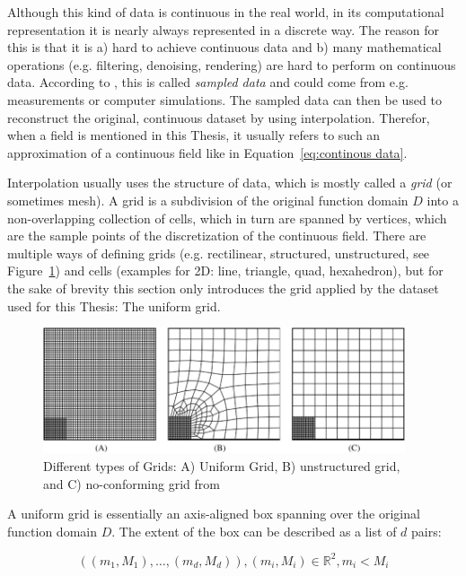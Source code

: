 Although this kind of data is continuous in the real world, in its computational representation it is nearly always represented in a discrete way. 
The reason for this is that it is a) hard to achieve continuous data and b) many mathematical operations (e.g. filtering, denoising, rendering) are hard to perform on continuous data. 
According to , this is called \textit{sampled data} and could come from e.g. measurements or computer simulations. 
The sampled data can then be used to reconstruct the original, continuous dataset by using interpolation. 
Therefor, when a field is mentioned in this Thesis, it usually refers to such an approximation of a continuous field like in Equation~\ref{eq:continous data}. 


Interpolation usually uses the structure of data, which is mostly called a \textit{grid} (or sometimes mesh). 
A grid is a subdivision of the original function domain $D$ into a non\--overlapping collection of cells, which in turn are spanned by vertices, which are the sample points of the discretization of the continuous field.  
There are multiple ways of defining grids (e.g. rectilinear, structured, unstructured, see Figure~\ref{fig:grid types}) and cells (examples for 2D: line, triangle, quad, hexahedron), but for the sake of brevity this section only introduces the grid applied by the dataset used for this Thesis: The uniform grid. 

\begin{figure}
  \includegraphics[width=0.95\textwidth]{figures/grid-types.png}
  \caption{Different types of Grids: A) Uniform Grid, B) unstructured grid, and C) no-conforming grid from \cite{kaltenbacher_nonconforming_2022}}
  \label{fig:grid types}
\end{figure}


A uniform grid is essentially an axis-aligned box spanning over the original function domain $D$. 
The extent of the box can be described as a list of $d$ pairs:

\begin{equation}
  ((m_1, M_1),\dots,(m_d, M_d)), (m_i, M_i) \in \mathbb{R}^2, m_i < M_i
  \label{eq:uniform grid coordinates}
\end{equation}

